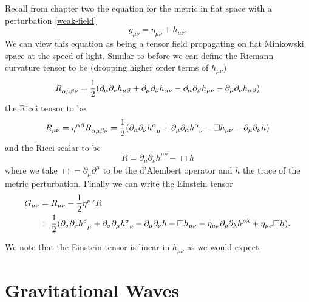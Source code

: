 Recall from chapter two the equation for the metric in flat space with a perturbation \eqref{weak-field}
\begin{equation}
	g_{\mu \nu} = \eta_{\mu \nu} + h_{\mu \nu} .
\end{equation}
We can view this equation as being a tensor field propagating on flat Minkowski space \cite{cheng} at the speed of light. Similar to before we can define the Riemann curvature tensor to be (dropping higher order terms of \(h_{\mu \nu}\)) \cite{cheng}
\begin{equation} \label{wave-riemann}
	R\indices{_\alpha_\mu_\beta_\nu} = \frac{1}{2} (\partial_{\alpha} \partial_{\nu} h_{\mu \beta} + \partial_{\mu} \partial_{\beta} h_{\alpha \nu} - \partial_{\alpha} \partial_{\beta} h_{\mu \nu} - \partial_{\mu} \partial_{\nu} h_{\alpha \beta})
\end{equation}
the Ricci tensor to be
\begin{equation} \label{wave-ricci}
	R_{\mu \nu} = \eta^{\alpha \beta} R\indices{_\alpha_\mu_\beta_\nu} = \frac{1}{2}(\partial_{\alpha} \partial_{\nu} h\indices{^\alpha_\mu} + \partial_{\mu} \partial_{\alpha} h\indices{^\alpha_\nu} - \Box h_{\mu \nu} - \partial_{\mu} \partial_{\nu} h)
\end{equation}
and the Ricci scalar to be
\begin{equation} \label{wave-ricci-scalar}
	R = \partial_{\mu} \partial_{\nu} h^{\mu \nu} - \Box h
\end{equation}
where we take \(\Box = \partial_{\mu} \partial^{\mu}\) to be the d'Alembert operator and \(h\) the trace of the metric perturbation. Finally we can write the Einstein tensor \cite{cheng, carroll}
\begin{equation} \label{wave-einstein}
	\begin{aligned}
		G_{\mu \nu} &= R_{\mu \nu} - \frac{1}{2} \eta^{\mu \nu} R \\
		&= \frac{1}{2} (\partial_{\sigma} \partial_{\nu} h\indices{^\sigma_\mu} + \partial_{\sigma} \partial_{\mu} h\indices{^\sigma_\nu} - \partial_{\mu} \partial_{\nu} h - \Box h_{\mu \nu} - \eta_{\mu \nu} \partial_{\rho} \partial_{\lambda} h^{\rho \lambda} + \eta_{\mu \nu} \Box h) .
	\end{aligned}
\end{equation}

We note that the Einstein tensor is linear in \(h_{\mu \nu}\) as we would expect.

\section{Gravitational Waves}

